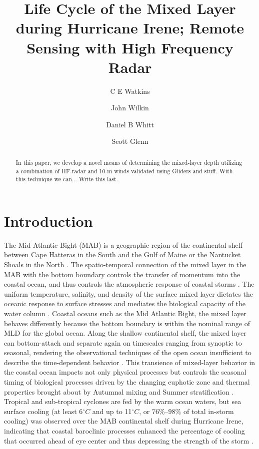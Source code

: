 \documentclass{article}
\title{Life Cycle of the Mixed Layer during Hurricane Irene; Remote Sensing with High Frequency Radar}
\author[1]{C E Watkins}
\author[1]{John Wilkin}
\author[2]{Daniel B Whitt}
\author[1]{Scott Glenn}
\affil[1]{Department of Marine and Coastal Sciences, Rutgers, New Brunswick, NJ, USA}
\affil[2]{National Center for Atmospheric Research, Boulder, CO, USA.}
\begin{document}
\maketitle
 
\begin{abstract}
In this paper, we develop a novel means of determining the mixed-layer depth utilizing a combination of HF-radar and 10-m winds validated using Gliders and stuff. With this technique we can... Write this last.
\end{abstract}

\doublespacing
\section*{Introduction}
The Mid-Atlantic Bight (MAB) is a geographic region of the continental shelf between Cape Hatteras in the South and the Gulf of Maine or the Nantucket Shoals in the North \cite{Houghton1982}.
The spatio-temporal connection of the mixed layer in the MAB with the bottom boundary controls the transfer of momentum into the coastal ocean, and thus controls the atmospheric response of coastal storms \cite{Miles2013}.
The uniform temperature, salinity, and density of the surface mixed layer dictates the oceanic response to surface stresses and mediates the biological capacity of the water column \cite{Kraus1967,DeBoyerMontegut2004,Carvalho2017}.
Coastal oceans such as the Mid Atlantic Bight, the mixed layer behaves differently because the bottom boundary is within the nominal range of MLD for the global ocean.
Along the shallow continental shelf, the mixed layer can bottom-attach and separate again on timescales ranging from synoptic to seasonal, rendering the observational techniques of the open ocean insufficient to describe the time-dependent behavior \cite{Mountain2003,Seroka2016}. 
This transience of mixed-layer behavior in the coastal ocean impacts not only physical processes but controls the seasonal timing of biological processes driven by the changing euphotic zone and thermal properties brought about by Autumnal mixing and Summer stratification \cite{xu2011seasonal,ambler2013seasonal,chen2018seasonal}.
Tropical and sub-tropical cyclones are fed by the warm ocean waters, but sea surface cooling (at least 6$^{\circ}C$ and up to 11$^{\circ}C$, or $76\%$–$98\%$ of total in-storm cooling) was observed over the MAB continental shelf during Hurricane Irene, indicating that coastal baroclinic processes enhanced the percentage of cooling that occurred ahead of eye center and thus depressing the strength of the storm \cite{Seroka2016,Glenn2016}. 
\end{document}
